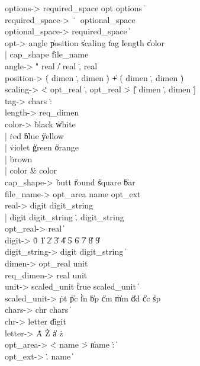 \begin{BNF}
options-> required_space opt options \| \e\\
required_space-> \.\ \ optional_space\\
optional_space-> required_space \| \e\\
opt-> angle \| position \| scaling \| tag \| length \| color\\
         | cap_shape \| file_name\\
angle-> \." real \| \./ real \., real\\
position-> \.( dimen \., dimen \.) \| \.+ \.( dimen \., dimen \.)\\
scaling-> \.< opt_real \., opt_real \.> \| \.[ dimen \., dimen \.]\\
tag-> chars \.:\\
length-> req_dimen\\
color-> \.{black} \| \.{white}\\
         | \.{red} \| \.{blue} \| \.{yellow}\\
         | \.{violet} \| \.{green} \| \.{orange}\\
         | \.{brown}\\
         | color \.{\&} color\\
cap_shape-> \.{butt} \| \.{round} \| \.{square} \| \.{bar}\\
file_name-> opt_area name opt_ext\\
real-> digit digit_string\\
         | digit digit_string \.. digit_string\\
opt_real-> real \| \e\\
digit-> \.0 \| \.1 \| \.2 \| \.3 \| \.4 \| \.5 \| \.6 \| \.7 \| \.8 \| \.9\\
digit_string-> digit digit_string \| \e\\
dimen-> opt_real unit\\
req_dimen-> real unit\\
unit-> scaled_unit \| \.{true} scaled_unit \| \e\\
scaled_unit-> \.{pt} \| \.{pc} \| \.{in} \| \.{bp} \| \.{cm} \| \.{mm}
         \| \.{dd} \| \.{cc} \| \.{sp}\\
chars-> chr chars \| \e\\
chr-> letter \| digit \\
letter-> \.A \dash \.Z \| \.a \dash \.z\\
opt_area-> \.< name \.> \| name \.: \| \e\\
opt_ext-> \.. name \| \e\\
\end{BNF}

